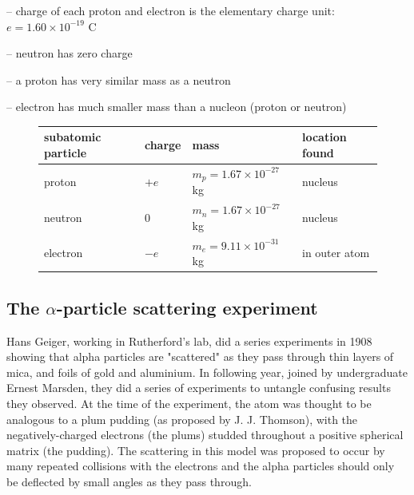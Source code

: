 \documentclass[a4paper,12pt]{book}
\begin{document}
\begin{compactenum}
	\item[--] charge of each proton and electron is the elementary charge unit: $e = 1.60 \times10^{-19} \text{ C}$
	
	\item[--] neutron has zero charge
	
	\item[--] a proton has very similar mass as a neutron
	
	\item[--] electron has much smaller mass than a nucleon (proton or neutron)
\end{compactenum}
\begin{figure}
\begin{center}
	\begin{tabular}{|C{3.5cm}|C{1.6cm}|C{3.5cm}|C{2.8cm}|}
		\hline subatomic particle & charge & mass & location found \\ 
		\hline proton & $+e$ & $m_p = 1.67 \times 10^{-27}$ kg & nucleus \\ 
		\hline neutron & 0 & $m_n = 1.67 \times 10^{-27}$ kg & nucleus \\ 
		\hline electron & $-e$ & $m_e = 9.11 \times 10^{-31}$ kg & in outer atom \\ 
		\hline 
	\end{tabular}
\end{center}
\end{figure}

\subsection{The $\alpha$-particle scattering experiment}

Hans Geiger, working in Rutherford's lab, did a series experiments in 1908 showing that alpha particles are "scattered" as they pass through thin layers of mica, and foils of gold and aluminium. In following year, joined by undergraduate Ernest Marsden, they did a series of experiments to untangle confusing results they observed. At the time of the experiment, the atom was thought to be analogous to a plum pudding (as proposed by J. J. Thomson), with the negatively-charged electrons (the plums) studded throughout a positive spherical matrix (the pudding). The scattering in this model was proposed to occur by many repeated collisions with the electrons and the alpha particles should only be deflected by small angles as they pass through.
\end{document}
